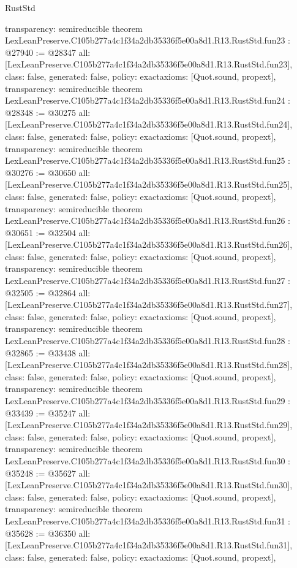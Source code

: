 \begin{lexlean}{RustStd}
\begin{coremodule}
{  transparency: semireducible
}
theorem LexLeanPreserve.C105b277a4c1f34a2db35336f5e00a8d1.R13.RustStd.fun23 : @27940 := @28347 {
  all: [LexLeanPreserve.C105b277a4c1f34a2db35336f5e00a8d1.R13.RustStd.fun23],
  class: false,
  generated: false,
  policy: exact{axioms: [Quot.sound, propext]},
  transparency: semireducible
}
theorem LexLeanPreserve.C105b277a4c1f34a2db35336f5e00a8d1.R13.RustStd.fun24 : @28348 := @30275 {
  all: [LexLeanPreserve.C105b277a4c1f34a2db35336f5e00a8d1.R13.RustStd.fun24],
  class: false,
  generated: false,
  policy: exact{axioms: [Quot.sound, propext]},
  transparency: semireducible
}
theorem LexLeanPreserve.C105b277a4c1f34a2db35336f5e00a8d1.R13.RustStd.fun25 : @30276 := @30650 {
  all: [LexLeanPreserve.C105b277a4c1f34a2db35336f5e00a8d1.R13.RustStd.fun25],
  class: false,
  generated: false,
  policy: exact{axioms: [Quot.sound, propext]},
  transparency: semireducible
}
theorem LexLeanPreserve.C105b277a4c1f34a2db35336f5e00a8d1.R13.RustStd.fun26 : @30651 := @32504 {
  all: [LexLeanPreserve.C105b277a4c1f34a2db35336f5e00a8d1.R13.RustStd.fun26],
  class: false,
  generated: false,
  policy: exact{axioms: [Quot.sound, propext]},
  transparency: semireducible
}
theorem LexLeanPreserve.C105b277a4c1f34a2db35336f5e00a8d1.R13.RustStd.fun27 : @32505 := @32864 {
  all: [LexLeanPreserve.C105b277a4c1f34a2db35336f5e00a8d1.R13.RustStd.fun27],
  class: false,
  generated: false,
  policy: exact{axioms: [Quot.sound, propext]},
  transparency: semireducible
}
theorem LexLeanPreserve.C105b277a4c1f34a2db35336f5e00a8d1.R13.RustStd.fun28 : @32865 := @33438 {
  all: [LexLeanPreserve.C105b277a4c1f34a2db35336f5e00a8d1.R13.RustStd.fun28],
  class: false,
  generated: false,
  policy: exact{axioms: [Quot.sound, propext]},
  transparency: semireducible
}
theorem LexLeanPreserve.C105b277a4c1f34a2db35336f5e00a8d1.R13.RustStd.fun29 : @33439 := @35247 {
  all: [LexLeanPreserve.C105b277a4c1f34a2db35336f5e00a8d1.R13.RustStd.fun29],
  class: false,
  generated: false,
  policy: exact{axioms: [Quot.sound, propext]},
  transparency: semireducible
}
theorem LexLeanPreserve.C105b277a4c1f34a2db35336f5e00a8d1.R13.RustStd.fun30 : @35248 := @35627 {
  all: [LexLeanPreserve.C105b277a4c1f34a2db35336f5e00a8d1.R13.RustStd.fun30],
  class: false,
  generated: false,
  policy: exact{axioms: [Quot.sound, propext]},
  transparency: semireducible
}
theorem LexLeanPreserve.C105b277a4c1f34a2db35336f5e00a8d1.R13.RustStd.fun31 : @35628 := @36350 {
  all: [LexLeanPreserve.C105b277a4c1f34a2db35336f5e00a8d1.R13.RustStd.fun31],
  class: false,
  generated: false,
  policy: exact{axioms: [Quot.sound, propext]},
}
\end{coremodule}
\end{lexlean}
